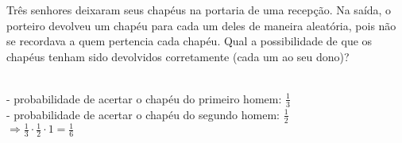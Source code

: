 \begin{ex}
 Três senhores deixaram seus chapéus na portaria de uma recepção. Na saída, o porteiro devolveu um chapéu para cada um deles de maneira aleatória, pois não se recordava a quem pertencia cada chapéu. Qual a possibilidade de que os chapéus tenham sido devolvidos corretamente (cada um ao seu dono)?
   \begin{sol}
    \phantom{A}  \\
    - probabilidade de acertar o chapéu do primeiro homem: $\frac{1}{3}$ \\
    - probabilidade de acertar o chapéu do segundo homem: $\frac{1}{2}$ \\
    $\Longrightarrow \frac{1}{3}\cdot\frac{1}{2}\cdot1=\frac{1}{6}$
   \end{sol}
\end{ex}